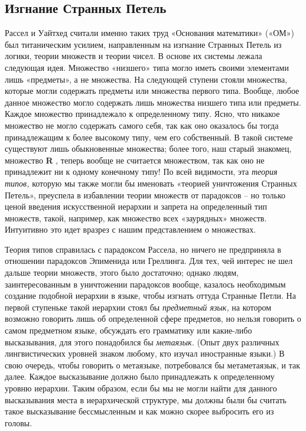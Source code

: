 \documentclass[../main.tex]{subfiles}
\begin{document}
\subsection{Изгнание Странных Петель}

Рассел и Уайтхед считали именно таких труд «Основания математики» («ОМ») был титаническим усилием, направленным на изгнание Странных Петель из логики, теории множеств и теории чисел. В основе их системы лежала следующая идея. Множество «низшего» типа могло иметь своими элементами лишь «предметы», а не множества. На следующей ступени стояли множества, которые могли содержать предметы или множества первого типа. Вообще, любое данное множество могло содержать лишь множества низшего типа или предметы. Каждое множество принадлежало к определенному типу. Ясно, что никакое множество не могло содержать самого себя, так как оно оказалось бы тогда принадлежащим к более высокому типу, чем его собственный. В такой системе существуют лишь обыкновенные множества; более того, наш старый знакомец, множество \textbf{R} , теперь вообще не считается множеством, так как оно не принадлежит ни к одному конечному типу! По всей видимости, эта \emph{теория типов,} которую мы также могли бы именовать «теорией уничтожения Странных Петель», преуспела в избавлении теории множеств от парадоксов \--- но только ценой введения искусственной иерархии и запрета на определенный тип множеств, такой, например, как множество всех «заурядных» множеств. Интуитивно это идет вразрез с нашим представлением о множествах.

Теория типов справилась с парадоксом Рассела, но ничего не предприняла в отношении парадоксов Эпименида или Греллинга. Для тех, чей интерес не шел дальше теории множеств, этого было достаточно; однако людям, заинтересованным в уничтожении парадоксов вообще, казалось необходимым создание подобной иерархии в языке, чтобы изгнать оттуда Странные Петли. На первой ступеньке такой иерархии стоял бы \emph{предметный язык,} на котором возможно говорить лишь об определенной сфере предметов, но нельзя говорить о самом предметном языке, обсуждать его грамматику или какие-либо высказывания, для этого понадобился бы \emph{метаязык.} (Опыт двух различных лингвистических уровней знаком любому, кто изучал иностранные языки.) В свою очередь, что­бы говорить о метаязыке, потребовался бы метаметаязык, и так далее. Каждое высказывание должно было принадлежать к определенному уровню иерархии. Таким образом, если бы мы не могли найти для данного высказывания места в иерархической структуре, мы должны были бы считать такое высказывание бессмысленным и как можно скорее выбросить его из головы.
\end{document}
